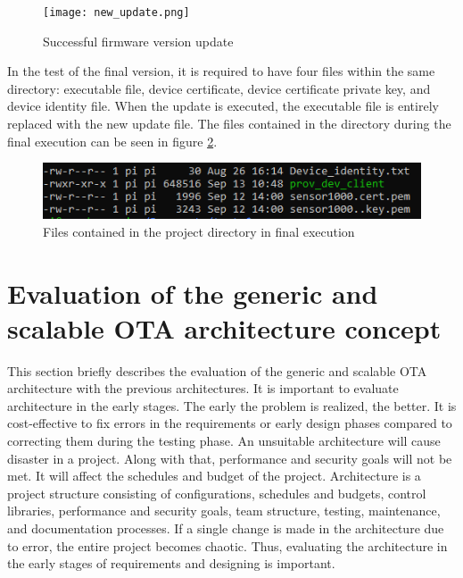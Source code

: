 \documentclass[12pt,a4paper]{article}
\begin{document}
{\begin{figure}[h]
\centering
\texttt{[image: new\_update.png]}
\caption{Successful firmware version update}
\label{new_update}
\end{figure}

In the test of the final version, it is required to have four files within the same directory: executable file, device certificate, device certificate private key, and device identity file. When the update is executed, the executable file is entirely replaced with the new update file. The files contained in the directory during the final execution can be seen in figure \ref{new_update}.

\begin{figure}[h]
\centering
\includegraphics[scale=1]{files_test.png}
\caption{Files contained in the project directory in final execution}
\label{new_update}
\end{figure}

\newpage

\renewcommand{\baselinestretch}{1.5} %
\section{Evaluation of the generic and scalable OTA architecture concept}

This section briefly describes the evaluation of the generic and scalable OTA architecture with the previous architectures. It is important to evaluate architecture in the early stages. The early the problem is realized, the better. It is cost-effective to fix errors in the requirements or early design phases compared to correcting them during the testing phase. An unsuitable architecture will cause disaster in a project. Along with that, performance and security goals will not be met. It will affect the schedules and budget of the project. Architecture is a project structure consisting of configurations, schedules and budgets, control libraries, performance and security goals, team structure, testing, maintenance, and documentation processes. If a single change is made in the architecture due to error, the entire project becomes chaotic. Thus, evaluating the architecture in the early stages of requirements and designing is important. \cite{r40} \\

}
\end{document}
